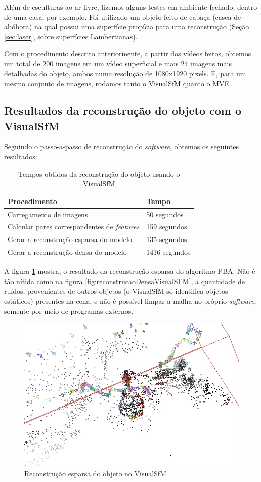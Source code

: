 
Além de esculturas ao ar livre, fizemos alguns testes em ambiente fechado, dentro de uma casa, por exemplo. Foi utilizado um objeto feito de cabaça (casca de abóbora) na qual possui uma superfície propícia para uma reconstrução (Seção \ref{sec:laser}, sobre superfícies Lambertianas). 

Com o procedimento descrito anteriormente, a partir dos vídeos feitos, obtemos um total de 200 imagens em um vídeo superficial e mais 24 imagens mais detalhadas do objeto, ambos numa resolução de 1080x1920 pixels. E, para um mesmo conjunto de imagens, rodamos tanto o VisualSfM quanto o MVE.

\subsection{Resultados da reconstrução do objeto com o VisualSfM}
Seguindo o passo-a-passo de reconstrução do {\it software}, obtemos os seguintes resultados:

\begin{table}
\caption{Tempos obtidos da reconstrução do objeto usando o VisualSfM}
\label{tab:temposSfM}
\begin{tabular}{|l|p{4.7cm}|}
\hline
Procedimento & Tempo \\ \hline
Carregamento de imagens & 50 segundos \\ \hline
Calcular pares correspondentes de {\it features} & 159 segundos \\ \hline
Gerar a reconstrução esparsa do modelo & 135 segundos \\ \hline
Gerar a reconstrução densa do modelo & 1416 segundos \\ \hline
\end{tabular}
\end{table}

A figura \ref{fig:reconstrucaoEsparsaVisualSFM} mostra, o resultado da reconstrução esparsa do algoritmo PBA. Não é tão nítida como na figura \ref{fig:reconstrucaoDensaVisualSFM}, a quantidade de ruídos, provenientes de outros objetos (o VisualSfM só identifica objetos estáticos) presentes na cena, e não é possível limpar a malha no próprio {\it software}, somente por meio de programas externos.

\begin{figure}[!h]
	\centering
	\includegraphics[width=0.5\linewidth]{figs/galinhasparsa.jpg}
	\caption{%
	Reconstrução esparsa do objeto no VisualSfM
	}\label{fig:reconstrucaoEsparsaVisualSFM}
\end{figure}

